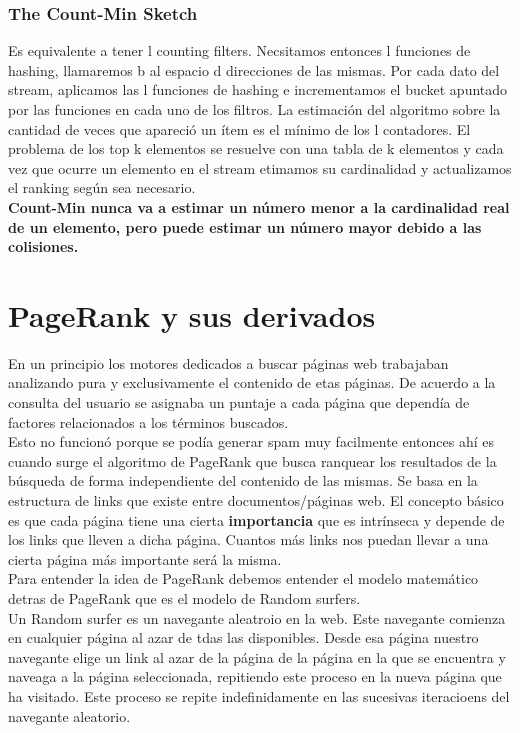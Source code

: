 \documentclass[titlepage,a4paper]{article}
\begin{document}
\subsubsection{The Count-Min Sketch}
Es equivalente a tener l counting filters. Necsitamos entonces l funciones de hashing, llamaremos b al espacio d direcciones de las mismas. Por cada dato del stream, aplicamos las l funciones de hashing e incrementamos el bucket apuntado por las funciones en cada uno de los filtros. La estimación del algoritmo sobre la cantidad de veces que apareció un ítem es el mínimo de los l contadores. El problema de los top k elementos se resuelve con una tabla de k  elementos y cada vez que ocurre un elemento en el stream etimamos su cardinalidad y actualizamos el ranking según sea necesario. \\

 \textbf{Count-Min nunca va a estimar un número menor a la cardinalidad real de un elemento, pero puede estimar un número mayor debido a las colisiones. }
 
\section*{PageRank y sus derivados}
En un principio los motores dedicados a buscar páginas web trabajaban analizando pura y exclusivamente el contenido de etas páginas. De acuerdo a la consulta del usuario se asignaba un puntaje a cada página que dependía de factores relacionados a los términos buscados. \\

Esto no funcionó porque se podía generar spam muy facilmente entonces ahí es cuando surge el algoritmo de PageRank que busca ranquear los resultados de la búsqueda de forma independiente del contenido de las mismas. Se basa en la estructura de links que existe entre documentos/páginas web. El concepto básico es que cada página tiene una cierta \textbf{importancia} que es intrínseca y depende de los links que lleven a dicha página. Cuantos más links nos puedan llevar a una cierta página más importante será la misma. \\

Para entender la idea de PageRank debemos entender el modelo matemático detras de PageRank que es el modelo de Random surfers. \\

Un Random surfer es un navegante aleatroio en la web. Este navegante comienza en cualquier página al azar de tdas las disponibles. Desde esa página nuestro navegante elige un link al azar de la página de la  página en la que se encuentra y naveaga a la página seleccionada, repitiendo este proceso en la nueva página que ha visitado. Este proceso se repite indefinidamente en las sucesivas iteracioens del navegante aleatorio. \\
\end{document}
